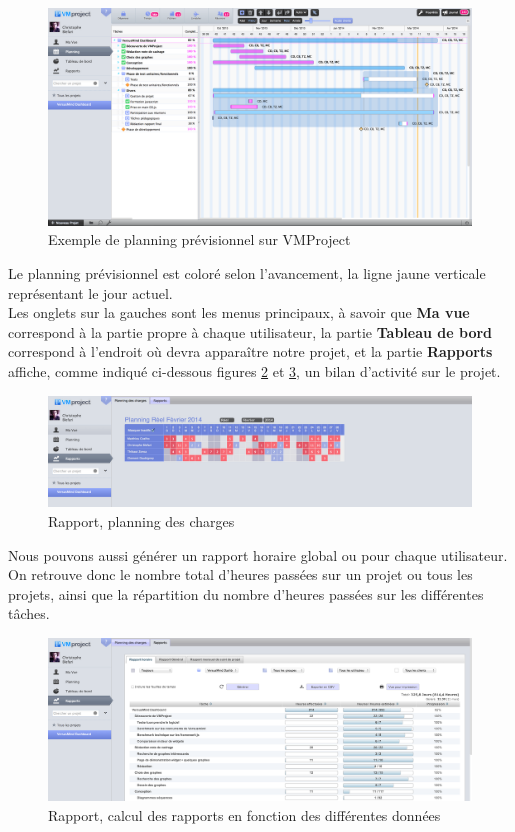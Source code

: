 \documentclass[12pt]{report}
\begin{document}
\begin{figure}[H]
	\centering
	\includegraphics[width=1\textwidth]{pictures/exemple_planning_previsionnel.png}
	\caption{Exemple de planning prévisionnel sur VMProject}
	\label{1}
\end{figure}

Le planning prévisionnel est coloré selon l’avancement, la ligne jaune verticale représentant le jour actuel.\\

Les onglets sur la gauches sont les menus principaux, à savoir que \textbf{Ma vue} correspond à la partie propre à chaque utilisateur, la partie \textbf{Tableau de bord} correspond à l’endroit où devra apparaître notre projet, et la partie \textbf{Rapports} affiche, comme indiqué ci-dessous figures \ref{2} et \ref{3}, un bilan d’activité sur le projet.\\

\begin{figure}[H]
	\centering
	\includegraphics[width=1\textwidth]{pictures/rapport1.png}
	\caption{Rapport, planning des charges}
	\label{2}
\end{figure}

Nous pouvons aussi générer un rapport horaire global ou pour chaque utilisateur. On retrouve donc le nombre total d’heures passées sur un projet ou tous les projets, ainsi que la répartition du nombre d’heures passées sur les différentes tâches.

\begin{figure}[H]
	\centering
	\includegraphics[width=1\textwidth]{pictures/rapport2.png}
	\caption{Rapport, calcul des rapports en fonction des différentes données}
	\label{3}
\end{figure}
\end{document}

